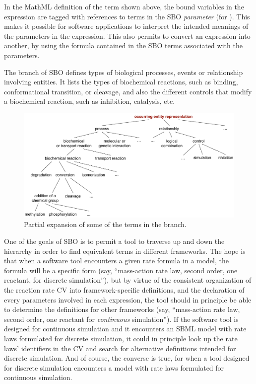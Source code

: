 In the MathML definition of the term shown above, the bound
variables in the  expression are tagged with
references to terms in the SBO \emph{ parameter}  (for
  ).
This makes it possible for software applications to interpret the
intended meanings of the parameters in the expression.  This also permits to convert an expression into another, by using the \mathmltwo formula contained in the SBO terms associated with the parameters.

The \emph{} branch of SBO defines types of biological processes, events or relationship involving entities.  It lists the types of biochemical reactions, such as binding,
conformational transition, or cleavage, and also the different
controls that modify a biochemical reaction, such as inhibition,
catalysis, etc.

\begin{figure}[tbh]
  \centering
  \includegraphics[scale = 0.8]{figs/sbo-interaction}
  \caption{Partial expansion of some of the terms in the \emph{} branch.}
  \label{fig:sbo-interaction}
\end{figure}

One of the goals of SBO is to permit a tool to traverse up and
down the hierarchy in order to find equivalent terms in different
frameworks.  The hope is that when a software tool encounters a
given rate formula in a model, the formula will be a specific form
(say, ``mass-action rate law, second order, one reactant, for
discrete simulation''), but by virtue of the consistent
organization of the reaction rate CV into framework-specific
definitions, and the declaration of every parameters involved in each expression, the tool should in principle be able to determine the
definitions for other frameworks (say, ``mass-action rate law,
second order, one reactant for \emph{continuous} simulation'').
If the software tool is designed for continuous simulation and it
encounters an SBML model with rate laws formulated for discrete
simulation, it could in principle look up the rate laws'
identifiers in the CV and search for alternative definitions
intended for discrete simulation.  And of course, the converse is
true, for when a tool designed for discrete simulation encounters
a model with rate laws formulated for continuous simulation.

